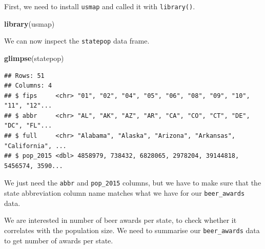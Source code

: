 \documentclass[
]{book}
\newenvironment{Shaded}{\begin{snugshade}}{\end{snugshade}}
\newcommand{\DecValTok}[1]{\textcolor[rgb]{0.00,0.00,0.81}{#1}}
\newcommand{\KeywordTok}[1]{\textcolor[rgb]{0.13,0.29,0.53}{\textbf{#1}}}
\newcommand{\NormalTok}[1]{#1}
\newcommand{\OperatorTok}[1]{\textcolor[rgb]{0.81,0.36,0.00}{\textbf{#1}}}
\newcommand{\StringTok}[1]{\textcolor[rgb]{0.31,0.60,0.02}{#1}}
\begin{document}
First, we need to install \texttt{usmap} and called it with \texttt{library()}.

\begin{Shaded}
\begin{Highlighting}[]
\KeywordTok{library}\NormalTok{(usmap)}
\end{Highlighting}
\end{Shaded}

We can now inspect the \texttt{statepop} data frame.

\begin{Shaded}
\begin{Highlighting}[]
\KeywordTok{glimpse}\NormalTok{(statepop)}
\end{Highlighting}
\end{Shaded}

\begin{verbatim}
## Rows: 51
## Columns: 4
## $ fips     <chr> "01", "02", "04", "05", "06", "08", "09", "10", "11", "12"...
## $ abbr     <chr> "AL", "AK", "AZ", "AR", "CA", "CO", "CT", "DE", "DC", "FL"...
## $ full     <chr> "Alabama", "Alaska", "Arizona", "Arkansas", "California", ...
## $ pop_2015 <dbl> 4858979, 738432, 6828065, 2978204, 39144818, 5456574, 3590...
\end{verbatim}

We just need the \texttt{abbr} and \texttt{pop\_2015} columns, but we have to make sure that the state abbreviation column name matches what we have for our \texttt{beer\_awards} data.

\begin{Shaded}
\end{Shaded}

We are interested in number of beer awards per state, to check whether it correlates with the population size. We need to summarise our \texttt{beer\_awards} data to get number of awards per state.

\begin{Shaded}
\end{Shaded}
\end{document}

